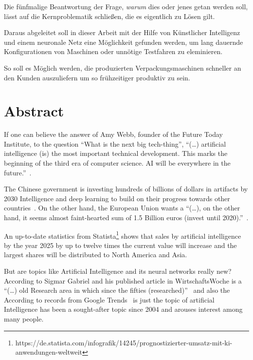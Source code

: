 Die fünfmalige Beantwortung der Frage, \textit{warum} dies oder jenes getan werden soll, lässt auf die Kernproblematik
schließen, die es eigentlich zu Lösen gilt.

Daraus abgeleitet soll in dieser Arbeit mit der Hilfe von Künstlicher Intelligenz und einem neuronale Netz eine
Möglichkeit gefunden werden, um lang dauernde Konfigurationen von Maschinen oder unnötige Testfahren zu eleminieren.

So soll es Möglich werden, die produzierten Verpackungsmaschinen schneller an den Kunden auszuliefern um so frühzeitiger
produktiv zu sein.

\newpage

\section{Abstract}
\label{sec:abstract}
If one can believe the answer of Amy Webb, founder of the Future Today Institute, to the question \enquote{What is the
next big tech-thing}, \enquote{(\ldots) artificial intelligence (is) the most important technical development. This
marks the beginning of the third era of computer science. AI will be everywhere in the future.}~\cite{article_einleitung_dub_aw}.

The Chinese government is investing hundreds of billions of dollars in artifacts by 2030 Intelligence and deep learning
to build on their progress towards other countries~\cite{article_einleitung_css}. On the other hand, the European Union
wants a \enquote{(\ldots), on the other hand, it seems almost faint-hearted sum of 1.5 Billion euros (invest until
2020).}~\cite{article_einleitung_ww_sg}.

An up-to-date statistics from Statista\footnote{https://de.statista.com/infografik/14245/prognostizierter-umsatz-mit-ki-anwendungen-weltweit}
shows that sales by artificial intelligence by the year 2025 by up to twelve times the current value will increase and
the largest shares will be distributed to North America and Asia.

But are topics like Artificial Intelligence and its neural networks really new? According to Sigmar Gabriel and his
published article in WirtschaftsWoche is a \enquote{(\ldots) old Research area in which since the fifties
(researched)}~\cite{article_einleitung_ww_sg} and also the According to records from Google
Trends~\cite{online_einleitung_googletrends} is just the topic of artificial Intelligence has been a sought-after topic
since 2004 and arouses interest among many people.

